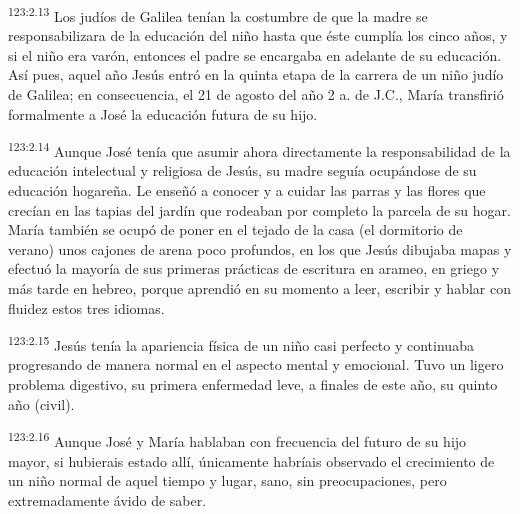 \par
\textsuperscript{123:2.13} Los judíos de Galilea tenían la costumbre de que la madre se responsabilizara de la educación del niño hasta que éste cumplía los cinco años, y si el niño era varón, entonces el padre se encargaba en adelante de su educación. Así pues, aquel año Jesús entró en la quinta etapa de la carrera de un niño judío de Galilea; en consecuencia, el 21 de agosto del año 2 a. de J.C., María transfirió formalmente a José la educación futura de su hijo.

\par
\textsuperscript{123:2.14} Aunque José tenía que asumir ahora directamente la responsabilidad de la educación intelectual y religiosa de Jesús, su madre seguía ocupándose de su educación hogareña. Le enseñó a conocer y a cuidar las parras y las flores que crecían en las tapias del jardín que rodeaban por completo la parcela de su hogar. María también se ocupó de poner en el tejado de la casa (el dormitorio de verano) unos cajones de arena poco profundos, en los que Jesús dibujaba mapas y efectuó la mayoría de sus primeras prácticas de escritura en arameo, en griego y más tarde en hebreo, porque aprendió en su momento a leer, escribir y hablar con fluidez estos tres idiomas.

\par
\textsuperscript{123:2.15} Jesús tenía la apariencia física de un niño casi perfecto y continuaba progresando de manera normal en el aspecto mental y emocional. Tuvo un ligero problema digestivo, su primera enfermedad leve, a finales de este año, su quinto año (civil).

\par
\textsuperscript{123:2.16} Aunque José y María hablaban con frecuencia del futuro de su hijo mayor, si hubierais estado allí, únicamente habríais observado el crecimiento de un niño normal de aquel tiempo y lugar, sano, sin preocupaciones, pero extremadamente ávido de saber.

